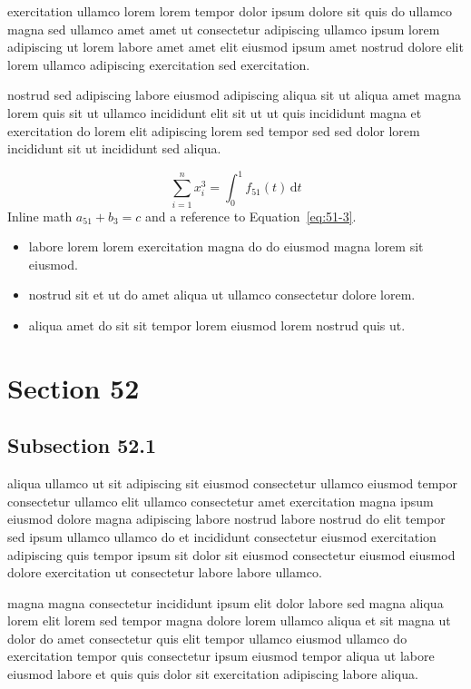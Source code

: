 \documentclass{article}
\begin{document}
exercitation ullamco lorem lorem tempor dolor ipsum dolore sit quis do ullamco magna sed ullamco amet amet ut consectetur adipiscing ullamco ipsum lorem adipiscing ut lorem labore amet amet elit eiusmod ipsum amet nostrud dolore elit lorem ullamco adipiscing exercitation sed exercitation.

nostrud sed adipiscing labore eiusmod adipiscing aliqua sit ut aliqua amet magna lorem quis sit ut ullamco incididunt elit sit ut ut quis incididunt magna et exercitation do lorem elit adipiscing lorem sed tempor sed sed dolor lorem incididunt sit ut incididunt sed aliqua.

\begin{equation}\label{eq:51-3}
  \sum_{i=1}^{n} x_i^{3} = \int_0^1 f_{51}(t)\,\mathrm{d}t
\end{equation}
Inline math $a_{51} + b_{3} = c$ and a reference to Equation~\eqref{eq:51-3}.

\begin{itemize}
  \item labore lorem lorem exercitation magna do do eiusmod magna lorem sit eiusmod.
  \item nostrud sit et ut do amet aliqua ut ullamco consectetur dolore lorem.
  \item aliqua amet do sit sit tempor lorem eiusmod lorem nostrud quis ut.
\end{itemize}

\section{Section 52}\label{sec:52}
\subsection{Subsection 52.1}\label{sec:52-1}
aliqua ullamco ut sit adipiscing sit eiusmod consectetur ullamco eiusmod tempor consectetur ullamco elit ullamco consectetur amet exercitation magna ipsum eiusmod dolore magna adipiscing labore nostrud labore nostrud do elit tempor sed ipsum ullamco ullamco do et incididunt consectetur eiusmod exercitation adipiscing quis tempor ipsum sit dolor sit eiusmod consectetur eiusmod eiusmod dolore exercitation ut consectetur labore labore ullamco.

magna magna consectetur incididunt ipsum elit dolor labore sed magna aliqua lorem elit lorem sed tempor magna dolore lorem ullamco aliqua et sit magna ut dolor do amet consectetur quis elit tempor ullamco eiusmod ullamco do exercitation tempor quis consectetur ipsum eiusmod tempor aliqua ut labore eiusmod labore et quis quis dolor sit exercitation adipiscing labore aliqua.
\end{document}
